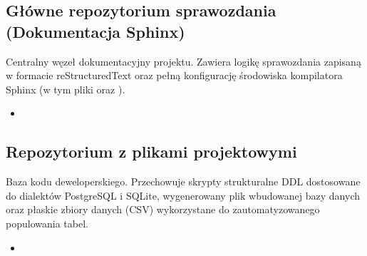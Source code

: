 \documentclass[a4paper,11pt,english,openany,oneside]{sphinxmanual}
\begin{document}
\subsection{Główne repozytorium sprawozdania (Dokumentacja Sphinx)}
\label{\detokenize{rozdzial_1/index:glowne-repozytorium-sprawozdania-dokumentacja-sphinx}}
\sphinxAtStartPar
Centralny węzeł dokumentacyjny projektu. Zawiera logikę sprawozdania zapisaną w formacie reStructuredText oraz pełną konfigurację środowiska kompilatora Sphinx (w tym pliki  oraz ).
\begin{itemize}
\item {} 
\sphinxAtStartPar
{} 

\end{itemize}


\subsection{Repozytorium z plikami projektowymi}
\label{\detokenize{rozdzial_1/index:repozytorium-z-plikami-projektowymi}}
\sphinxAtStartPar
Baza kodu deweloperskiego. Przechowuje skrypty strukturalne DDL dostosowane do dialektów PostgreSQL i SQLite, wygenerowany plik wbudowanej bazy danych oraz płaskie zbiory danych (CSV) wykorzystane do zautomatyzowanego populowania tabel.
\begin{itemize}
\item {} 
\sphinxAtStartPar
{} 

\end{itemize}
\end{document}
